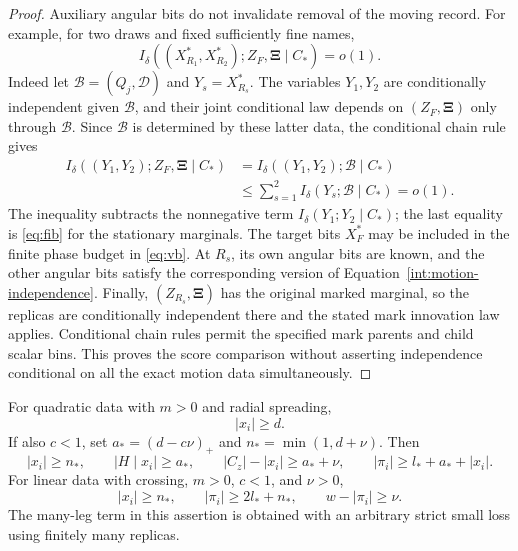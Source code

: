 \begin{proof}
Auxiliary angular bits do not invalidate removal of
the moving record. For example, for two draws and
fixed sufficiently fine names,
\begin{equation}\label{int:motion-independence}
 I_\delta((X_{R_1}^*,X_{R_2}^*);Z_F,\boldsymbol\Xi
                  \mid C_*)=o(1).
\end{equation}
Indeed let $\mathcal B=(Q_j,\mathcal D)$ and
$Y_s=X_{R_s}^*$. The variables $Y_1,Y_2$ are
conditionally independent given $\mathcal B$,
and their joint conditional law depends on
$(Z_F,\boldsymbol\Xi)$ only through
$\mathcal B$. Since $\mathcal B$ is determined
by these latter data, the conditional chain rule
gives
\[
 \begin{split}
 I_\delta((Y_1,Y_2);Z_F,\boldsymbol\Xi\mid C_*)
 &=I_\delta((Y_1,Y_2);\mathcal B\mid C_*)\\
 &\leq\sum_{s=1}^2 I_\delta(Y_s;\mathcal B\mid C_*)
 =o(1).
 \end{split}
\]
The inequality subtracts the nonnegative term
$I_\delta(Y_1;Y_2\mid C_*)$; the last equality
is \eqref{eq:fib} for the stationary marginals.
The target
bits $X_F^*$ may be included in the finite phase
budget in \eqref{eq:vb}. At $R_s$, its own angular
bits are known, and the other angular bits satisfy
the corresponding version of
Equation~\eqref{int:motion-independence}. Finally,
$(Z_{R_s},\boldsymbol\Xi)$ has the original marked
marginal, so the replicas are conditionally independent
there and the stated mark innovation law applies.
Conditional chain rules permit the specified mark
parents and child scalar bins. This proves the score
comparison without asserting independence conditional
on all the exact motion data simultaneously.
\end{proof}

\begin{proposition}\label{int:orientation-rates}
For quadratic data with $m>0$ and radial spreading,
\begin{equation}
 |x_i|\geq d.
 \tag{cross-q}\label{eq:cross-q}
\end{equation}
If also $c<1$, set $a_*=(d-c\nu)_+$ and
$n_* =\min(1,d+\nu)$. Then
\begin{equation}
 |x_i|\geq n_*,\qquad |H\mid x_i|\geq a_*,\qquad
 |C_z|-|x_i|\geq a_*+\nu,\qquad
 |\pi_i|\geq l_*+a_*+|x_i|.
 \tag{mix-q}\label{eq:mix-q}
\end{equation}
For linear data with crossing, $m>0$, $c<1$, and $\nu>0$,
\begin{equation}
 |x_i|\geq n_*,\qquad |\pi_i|\geq2l_*+n_*,\qquad
 w-|\pi_i|\geq\nu.
 \tag{mix-l}\label{eq:mix-l}
\end{equation}
The many-leg term in this assertion is obtained with
an arbitrary strict small loss using finitely many replicas.
\end{proposition}

